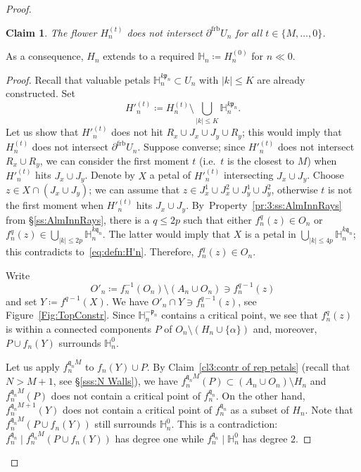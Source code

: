 \documentclass[]{amsart}
\newcommand{\fH}{{\mathbb H}}
\newcommand{\pp}{\mathfrak{p}}
\renewcommand{\qq}{\mathfrak{q}}
\newcommand\frb{{\operatorname{frb}}}
\newtheorem{claim3}{Claim}
\theoremstyle{remark}
\numberwithin{equation}{section}
\theoremstyle{definition}
\begin{document}
\begin{proof}
\begin{claim3}
\label{cl3:Nr4}
The flower $H_{n}^{(t)}$ does not intersect $\partial^\frb U_n$ for all $t\in \{M,\dots, 0\}$.
\end{claim3} 
\noindent As a consequence, $H_n$ extends to a required $\fH_n\coloneqq H_{n}^{(0)}$ for $n\ll 0$.
\begin{proof}
Recall that valuable petals $\fH_{n}^{ k\pp_n}\subset U_n$ with $|k| \le K$ are already constructed. Set
\begin{equation}
\label{eq:defn:H'n}
H'^{(t)}_{n}\coloneqq H^{(t)}_{n}\setminus \bigcup_{|k|\le K} \fH_{n}^{ k\pp_n}.
\end{equation}
Let us show that $H'^{(t)}_{n}$ does not hit $R_x\cup J_x\cup J_y\cup R_y$; this would imply that $H^{(t)}_n$ does not intersect $\partial ^\frb U_n$. Suppose converse; since $H'^{(t)}_{n}$ does not intersect $R_x\cup R_y$, we can consider the first moment $t$ (i.e.~$t$ is the closest to $M$) when $H'^{(t)}_{n}$ hits $J_x\cup J_y$. Denote by $X$ a petal of $H'^{(t)}_{n}$ intersecting $J_x\cup J_y$. Choose $z\in X \cap \left(J_x\cup J_y \right)$; we can assume that $z\in J_{x}^{1}\cup J_{x}^{2}\cup J_{y}^{1}\cup  J_{y}^{2}$, otherwise $t$ is not the first moment when $H'^{(t)}_{n}$ hits $J_x\cup J_y$. By~Property~\eqref{pr:3:ss:AlmInnRays} from \S\ref{ss:AlmInnRays}, there is a $q\le 2p$ such that either $f_n^{q}(z)\in O_n$ or $f_n^{q}(z)\in  \bigcup_{|k|\le 2p}\fH_{n}^{ k\qq_n} $. The latter would imply that $X$ is a petal in $\bigcup_{|k|\le 4p}\fH_{n}^{ k\qq_n}$; this contradicts to~\eqref{eq:defn:H'n}. Therefore, $f_n^{q}(z)\in O_n$.


Write \[O'_n\coloneqq f_{n}^{-1}(O_n)\setminus (A_n\cup O_n)\ni f_n^{q-1}(z)\] and  set $Y\coloneqq f^{q-1}(X)$. We have $O'_n\cap Y\ni  f_n^{q-1}(z)$,
see Figure~\ref{Fig:TopConstr}. Since $\fH^{-\pp_n}_n$ contains a critical point, we see that $f_n^q(z)$ is within a connected components $P$ of $ O_n\setminus (H_n\cup \{\alpha\})$ and, moreover, $P\cup f_n(Y)$ surrounds $\fH^{0}_n$.


 Let us apply $f_n^{\qq_n M}$ to $f_n(Y)\cup P$. By Claim~\ref{cl3:contr of rep petals} (recall that $N>M+1$, see \S\ref{sss:N Walls}), we have $f_n^{\qq_n M}(P)\subset (A_n\cup O_n)\setminus H_n$ and $f_n^{\qq_n M}(P)$ does not contain a critical point of $f_n^{\qq_n}$. On the other hand, $f_n^{\qq_n M+1}(Y)$ does not contain a critical point of $f^{\qq_n}_n$ as a subset of $H_n$. Note that $f^{\qq_n M}_n\left( P\cup f_n(Y)\right)$ still surrounds $\fH_n^0$. This is a contradiction: $f_n^{\qq_n}\mid f^{\qq_n M}_n\left( P\cup f_n(Y)\right)$ has degree one while $f_n^{\qq_n}\mid \fH_n^0$ has degree $2$.
\end{proof}


\end{proof}
\end{document}
